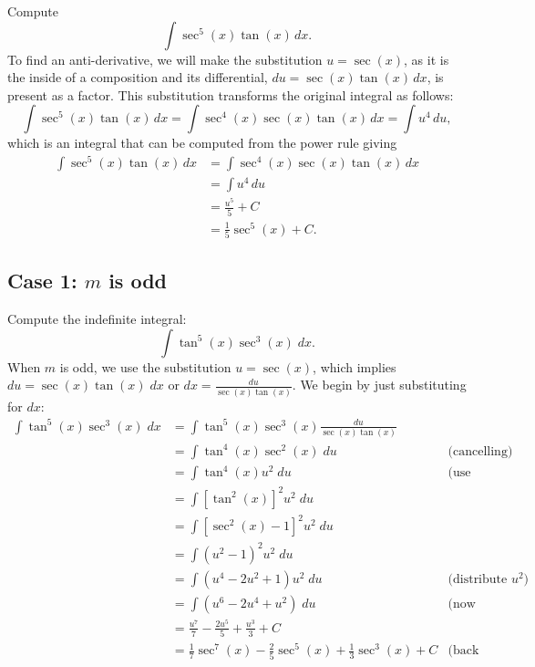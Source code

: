 \documentclass{ximera}
\begin{document}
\begin{example}

Compute
\[
\int \sec^5(x) \tan(x) \, dx.
\]
To find an anti-derivative, we will make the substitution $u = \sec(x)$, as it is the inside of a composition
and its differential, $du = \sec(x)\tan(x) \, dx$, is present as a factor. 
This substitution transforms the original integral as follows:
\[
\int \sec^5(x) \tan(x) \, dx = \int \sec^4(x) \sec(x) \tan(x) \, dx= \int u^4 \, du,
\]
which is an integral that can be computed from the power rule giving
\begin{align*}
\int \sec^5(x) \tan(x) \, dx &= \int \sec^4(x) \sec(x) \tan(x) \, dx\\
                             &= \int u^4 \, du\\
                             &= \frac{u^5}{5} + C\\
                             &= \frac15 \sec^5(x) + C.
\end{align*}

\end{example}
\subsection{Case 1: $m$ is odd}
\begin{example}
Compute the indefinite integral:
\[
\int \tan^5(x) \sec^3(x)\;dx.
\]
When $m$ is odd, we use the substitution $u = \sec(x)$,
which implies $du = \sec(x) \tan(x) \; dx$ or $dx = \frac{du}{\sec(x)\tan(x)}$.
We begin by just substituting for $dx$:
\begin{align*}
\int \tan^5(x) \sec^3(x)\;dx &= \int \tan^5(x) \sec^3(x) \frac{du}{\sec(x)\tan(x)}\\
&= \int \tan^4(x) \sec^2(x) \; du & \text{(cancelling)}\\
&= \int \tan^4(x) u^2 \; du & \text{(use Pythagorean identity)}\\
&= \int \left[\tan^2(x)\right]^2 u^2 \; du \\
&= \int \left[\sec^2(x) -1\right]^2 u^2 \; du \\
&= \int \left(u^2 -1\right)^2 u^2 \; du \\
&= \int \left(u^4 - 2u^2 +1\right) u^2 \; du & \text{(distribute $u^2$)}\\
&= \int \left(u^6 - 2u^4 +u^2\right) \; du & \text{(now integrate)}\\
&=  \frac{u^7}{7} - \frac{2u^5}{5} + \frac{u^3}{3} + C  \\
&= \frac17\sec^7(x) - \frac25 \sec^5(x) + \frac13 \sec^3(x) + C & \text{(back substituting)}
\end{align*}
\end{example}
\end{document}
